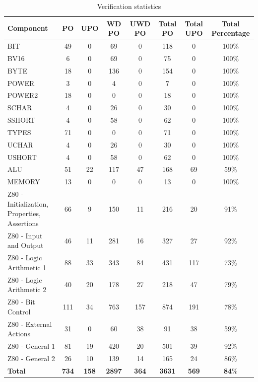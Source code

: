 \documentclass[a4paper]{llncs}
\begin{document}
\begin{table} [h]
\caption{Verification statistics }
\label{tab:completestatistcs}
\begin{center} 
\begin{tabular}{|p{3.1cm}|c|c||c|c||c|c|c|}
\hline 
{\small \textbf{Component}}&{\small \textbf{PO}}&{\small \textbf{UPO}}&{\small \textbf{WD PO}}&{\small \textbf{UWD PO }}&{\small \textbf{Total PO}}&{\small \textbf{Total UPO}}& {\small \textbf{Total Percentage}}  \\\hline
BIT&49&0&69&0&118&0&100\%\\\hline
BV16&6&0&69&0&75&0&100\%\\\hline
BYTE&18&0&136&0&154&0&100\%\\\hline
POWER&3&0&4&0&7&0&100\%\\\hline
POWER2&18&0 &0&0&18&0&100\%\\\hline
SCHAR&4&0&26&0&30&0&100\%\\\hline
SSHORT&4&0&58&0&62&0&100\%\\\hline
TYPES&71&0&0&0&71&0&100\%\\\hline
UCHAR&4&0&26&0&30&0&100\%\\\hline
USHORT&4&0&58&0&62&0&100\%\\\hline
ALU&51&22&117&47&168&69&59\%\\\hline
MEMORY&13&0&0&0&13&0&100\%\\\hline
Z80 -  {\scriptsize Initialization, Properties, Assertions} &66&9&150&11&216&20&91\%\\\hline
Z80 - {\scriptsize Input and Output}&46&11&281&16&327&27&92\%\\\hline
Z80 - {\scriptsize Logic Arithmetic 1}&88&33&343&84&431&117&73\%\\\hline
Z80 - {\scriptsize Logic Arithmetic 2}&40&20&178&27&218&47&79\%\\\hline
Z80 - {\scriptsize Bit Control}&111&34&763&157&874&191&78\%\\\hline
Z80 - {\scriptsize External Actions}&31&0&60&38&91&38&59\%\\\hline
Z80 - {\scriptsize General 1}&81&19&420&20&501&39&92\%\\\hline
Z80 - {\scriptsize General 2}&26&10&139&14&165&24&86\%\\\hline

\textbf{Total}&\textbf{734}&\textbf{158}&\textbf{2897}&\textbf{364}&\textbf{3631}&\textbf{569}&\textbf{84}\%\\\hline

\end{tabular}
\end{center} 
\end{table}
\end{document}
